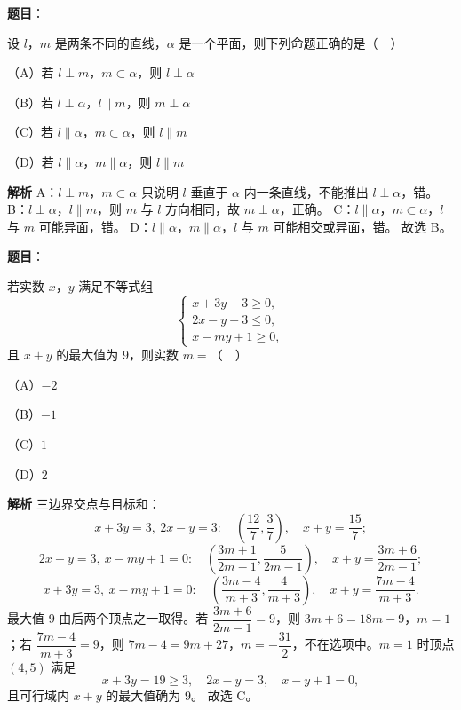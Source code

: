 \begin{answer}

\textbf{题目}：

设 $l$，$m$ 是两条不同的直线，$\alpha$ 是一个平面，则下列命题正确的是（　）

（A）若 $l\perp m$，$m\subset\alpha$，则 $l\perp\alpha$

（B）若 $l\perp\alpha$，$l\parallel m$，则 $m\perp\alpha$

（C）若 $l\parallel\alpha$，$m\subset\alpha$，则 $l\parallel m$

（D）若 $l\parallel\alpha$，$m\parallel\alpha$，则 $l\parallel m$

\textbf{解析}
A：$l\perp m$，$m\subset\alpha$ 只说明 $l$ 垂直于 $\alpha$ 内一条直线，不能推出 $l\perp\alpha$，错。
B：$l\perp\alpha$，$l\parallel m$，则 $m$ 与 $l$ 方向相同，故 $m\perp\alpha$，正确。
C：$l\parallel\alpha$，$m\subset\alpha$，$l$ 与 $m$ 可能异面，错。
D：$l\parallel\alpha$，$m\parallel\alpha$，$l$ 与 $m$ 可能相交或异面，错。
故选 B。


\end{answer}
\begin{answer}

\textbf{题目}：

若实数 $x$，$y$ 满足不等式组
\nopagebreak[4]
\[\begin{cases}
x+3y-3\geqslant 0,\\
2x-y-3\leqslant 0,\\
x-my+1\geqslant 0,
\end{cases}\]
且 $x+y$ 的最大值为 $9$，则实数 $m=$（　）

（A）$-2$

（B）$-1$

（C）$1$

（D）$2$

\textbf{解析}
三边界交点与目标和：
\nopagebreak[4]
\[x+3y=3,\ 2x-y=3:\quad \left(\frac{12}7,\frac37\right),\quad x+y=\frac{15}7;\]
\nopagebreak[4]
\[2x-y=3,\ x-my+1=0:\quad \left(\frac{3m+1}{2m-1},\frac5{2m-1}\right),\quad x+y=\frac{3m+6}{2m-1};\]
\nopagebreak[4]
\[x+3y=3,\ x-my+1=0:\quad \left(\frac{3m-4}{m+3},\frac4{m+3}\right),\quad x+y=\frac{7m-4}{m+3}.\]
最大值 $9$ 由后两个顶点之一取得。若 $\dfrac{3m+6}{2m-1}=9$，则 $3m+6=18m-9$，$m=1$；若 $\dfrac{7m-4}{m+3}=9$，则 $7m-4=9m+27$，$m=-\dfrac{31}2$，不在选项中。$m=1$ 时顶点 $(4,5)$ 满足
\nopagebreak[4]
\[x+3y=19\geqslant3,\quad 2x-y=3,\quad x-y+1=0,\]
且可行域内 $x+y$ 的最大值确为 $9$。
故选 C。


\end{answer}
